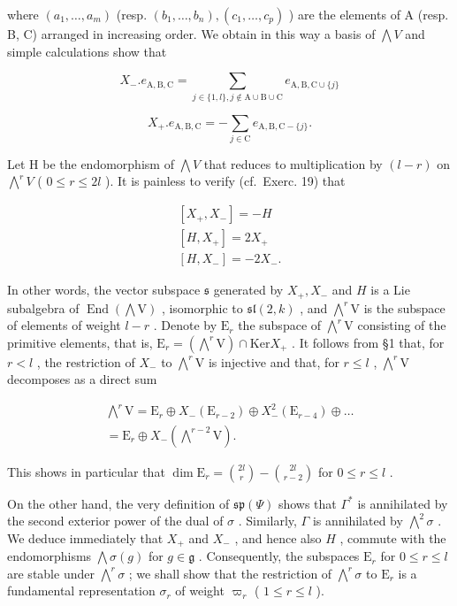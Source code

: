 where \((a_{1},\ldots,a_{m})\) (resp. \((b_{1},\ldots,b_{n}),(c_{1},\ldots,c_{p})\) ) are the elements of A (resp. B, C) arranged in increasing order. We obtain in this way a basis of \(\bigwedge V\) and simple calculations show that

\[
X _ {-}. e _ {\mathrm{A,B,C}} = \sum_ {j \in \{1, l \}, j \notin \mathrm{A} \cup \mathrm{B} \cup \mathrm{C}} e _ {\mathrm{A,B,C} \cup \{j \}}\tag{8}
\]

\[
X _ {+}. e _ {\mathrm{A,B,C}} = - \sum_ {j \in \mathrm{C}} e _ {\mathrm{A,B,C-} \{j \}}.\tag{9}
\]

Let H be the endomorphism of \(\bigwedge V\) that reduces to multiplication by \((l - r)\) on \(\bigwedge^{r}V\) ( \(0 \leq r \leq 2l\) ). It is painless to verify (cf.~Exerc. 19) that

\[
\begin{array}{c} {[ X _ {+}, X _ {-} ] = - H} \\ {[ H, X _ {+} ] = 2 X _ {+}} \\ {[ H, X _ {-} ] = - 2 X _ {-}.} \end{array}
\]

In other words, the vector subspace \(\mathfrak{s}\) generated by \(X_{+}, X_{-}\) and \(H\) is a Lie subalgebra of \(\operatorname{End}(\bigwedge \mathrm{V})\) , isomorphic to \(\mathfrak{sl}(2, k)\) , and \(\bigwedge^{r} \mathrm{V}\) is the subspace of elements of weight \(l - r\) . Denote by \(\mathrm{E}_{r}\) the subspace of \(\bigwedge^{r} \mathrm{V}\) consisting of the primitive elements, that is, \(\mathrm{E}_{r} = (\bigwedge^{r} \mathrm{V}) \cap \mathrm{Ker} X_{+}\) . It follows from §1 that, for \(r < l\) , the restriction of \(X_{-}\) to \(\bigwedge^{r} \mathrm{V}\) is injective and that, for \(r \leq l\) , \(\bigwedge^{r} \mathrm{V}\) decomposes as a direct sum

\[
\begin{array}{c} \bigwedge^ {r} \mathrm{V} = \mathrm{E} _ {r} \oplus X _ {-} (\mathrm{E} _ {r - 2}) \oplus X _ {-} ^ {2} (\mathrm{E} _ {r - 4}) \oplus \dots \\ = \mathrm{E} _ {r} \oplus X _ {-} (\bigwedge^ {r - 2} \mathrm{V}). \end{array}
\]

This shows in particular that \(\dim \mathrm{E}_r = \binom{2l}{r} - \binom{2l}{r-2}\) for \(0 \leq r \leq l\) .

On the other hand, the very definition of \(\mathfrak{sp}(\varPsi)\) shows that \(\Gamma^{*}\) is annihilated by the second exterior power of the dual of \(\sigma\) . Similarly, \(\Gamma\) is annihilated by \(\bigwedge^{2}\sigma\) . We deduce immediately that \(X_{+}\) and \(X_{-}\) , and hence also \(H\) , commute with the endomorphisms \(\bigwedge\sigma(g)\) for \(g\in\mathfrak{g}\) . Consequently, the subspaces \(\mathrm{E}_{r}\) for \(0\leq r\leq l\) are stable under \(\bigwedge^{r}\sigma\) ; we shall show that the restriction of \(\bigwedge^{r}\sigma\) to \(\mathrm{E}_{r}\) is a fundamental representation \(\sigma_{r}\) of weight \(\varpi_{r}\) ( \(1\leq r\leq l\) ).

